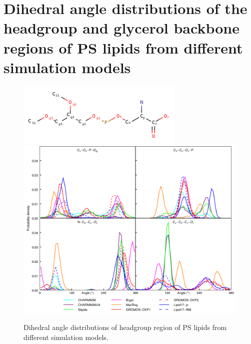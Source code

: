 \documentclass[journal=jpcbfk]{achemso}
\begin{document}
\pagebreak
\section{Dihedral angle distributions of the headgroup and glycerol backbone
  regions of PS lipids from different simulation models}

\begin{figure}[]
  \centering
  \includegraphics[width=8.0cm]{../Figs/PS_labels.png}
  \includegraphics[width=16.0cm]{../Figs/figS7.png}
  \caption{\label{dihedralsHG}
    Dihedral angle distributions of headgroup region of PS lipids from different simulation models.
  }
\end{figure}
\end{document}
